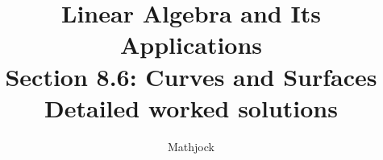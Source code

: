 
\title{\textbf{Linear Algebra and Its Applications}\\[0.3em]Section 8.6: Curves and Surfaces\\[0.3em]\large Detailed worked solutions}
\author{Mathjock}
\date{}

\maketitle
\bookinfo
\tableofcontents
\clearpage
\renewcommand{\thesection}{8.\arabic{section}}
\renewcommand{\theHsection}{8.\arabic{section}}
\setcounter{section}{5}



